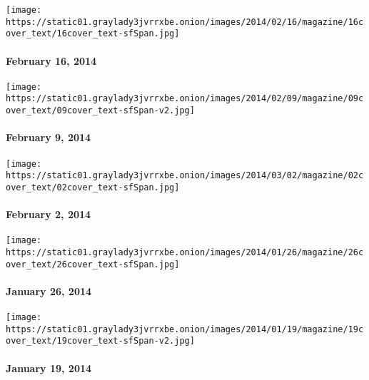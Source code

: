\href{http://www.nytimes3xbfgragh.onion/indexes/2014/02/16/magazine/index.html}{}

\texttt{[image: https://static01.graylady3jvrrxbe.onion/images/2014/02/16/magazine/16cover\_text/16cover\_text-sfSpan.jpg]}

\hypertarget{february-16-2014}{%
\paragraph{February 16, 2014}\label{february-16-2014}}

\href{http://www.nytimes3xbfgragh.onion/indexes/2014/02/09/magazine/index.html}{}

\texttt{[image: https://static01.graylady3jvrrxbe.onion/images/2014/02/09/magazine/09cover\_text/09cover\_text-sfSpan-v2.jpg]}

\hypertarget{february-9-2014}{%
\paragraph{February 9, 2014}\label{february-9-2014}}

\href{http://www.nytimes3xbfgragh.onion/indexes/2014/02/02/magazine/index.html}{}

\texttt{[image: https://static01.graylady3jvrrxbe.onion/images/2014/03/02/magazine/02cover\_text/02cover\_text-sfSpan.jpg]}

\hypertarget{february-2-2014}{%
\paragraph{February 2, 2014}\label{february-2-2014}}

\href{http://www.nytimes3xbfgragh.onion/indexes/2014/01/26/magazine/index.html}{}

\texttt{[image: https://static01.graylady3jvrrxbe.onion/images/2014/01/26/magazine/26cover\_text/26cover\_text-sfSpan.jpg]}

\hypertarget{january-26-2014}{%
\paragraph{January 26, 2014}\label{january-26-2014}}

\href{http://www.nytimes3xbfgragh.onion/indexes/2014/01/19/magazine/index.html}{}

\texttt{[image: https://static01.graylady3jvrrxbe.onion/images/2014/01/19/magazine/19cover\_text/19cover\_text-sfSpan-v2.jpg]}

\hypertarget{january-19-2014}{%
\paragraph{January 19, 2014}\label{january-19-2014}}

